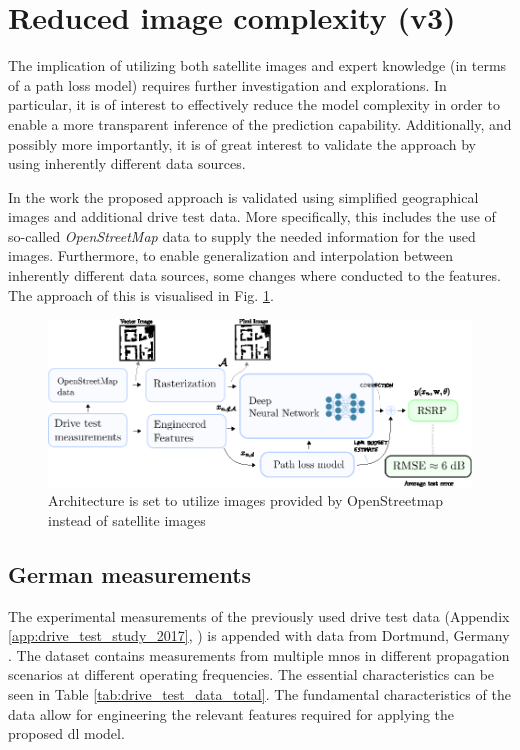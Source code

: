 \section{Reduced image complexity (v3)}
The implication of utilizing both satellite images and expert knowledge (in terms of a path loss model) requires further investigation and explorations. In particular, it is of interest to effectively reduce the model complexity in order to enable a more transparent inference of the prediction capability. Additionally, and possibly more importantly, it is of great interest to validate the approach by using inherently different data sources. 

In the work \cite{Thrane2020DeepKnowledge} the proposed approach is validated using simplified geographical images and additional drive test data. More specifically, this includes the use of so-called \emph{OpenStreetMap} data to supply the needed information for the used images. Furthermore, to enable generalization and interpolation between inherently different data sources, some changes where conducted to the features. The approach of this is visualised in Fig. \ref{fig:version3_architecture_figure}.

\begin{figure}
    \centering
    \includegraphics{chapters/part_pathloss/osm_images_paper/figures/version3_architecture_figure.eps}
    \caption{Architecture is set to utilize images provided by OpenStreetmap instead of satellite images}
    \label{fig:version3_architecture_figure}
\end{figure}




\subsection{German measurements}

The experimental measurements of the previously used drive test data  (Appendix \ref{app:drive_test_study_2017}, \cite{1xf4-eg98-19}) is appended with data from Dortmund, Germany \cite{SliwaEmpiricalNetworks}. The dataset contains measurements from multiple \glspl{mno} in different propagation scenarios at different operating frequencies. The essential characteristics can be seen in Table \ref{tab:drive_test_data_total}. The fundamental characteristics of the data allow for engineering the relevant features required for applying the proposed \gls{dl} model.

